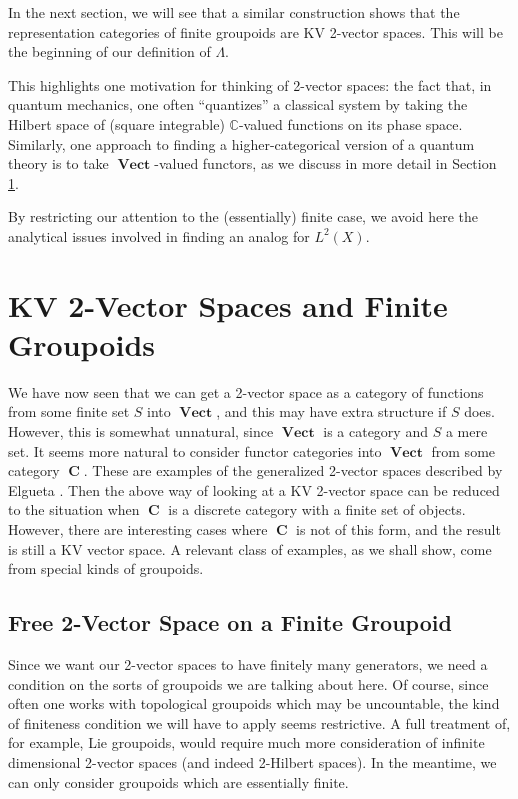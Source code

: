 \documentclass[10pt]{amsart}
\numberwithin{theorem}{subsection}
\newcommand{\opname}[1]{\operatorname{#1}}
\newcommand{\catname}[1]{\boldsymbol{\opname{{#1}}}}
\newcommand{\C}{\catname{C}}
\newcommand{\V}{\catname{Vect}}
\newcommand{\FV}{\Lambda}
\begin{document}
In the next section, we will see that a similar construction shows that the representation categories of finite groupoids are KV 2-vector spaces.  This will be the beginning of our definition of $\FV$.

This highlights one motivation for thinking of 2-vector spaces: the
fact that, in quantum mechanics, one often ``quantizes'' a classical
system by taking the Hilbert space of (square integrable)
$\mathbb{C}$-valued functions on its phase space.  Similarly, one
approach to finding a higher-categorical version of a quantum theory
is to take $\V$-valued functors, as we discuss in more detail in
Section \ref{sec:kv2vsgrpd}.

By restricting our attention to the (essentially) finite case, we
avoid here the analytical issues involved in finding an analog for
$L^2(X)$.

\section{KV 2-Vector Spaces and Finite Groupoids}\label{sec:kv2vsgrpd}

We have now seen that we can get a 2-vector space as a category of
functions from some finite set $S$ into $\V$, and this may have extra
structure if $S$ does.  However, this is somewhat unnatural, since
$\V$ is a category and $S$ a mere set.  It seems more natural to
consider functor categories into $\V$ from some category $\C$.  These
are examples of the generalized 2-vector spaces described by Elgueta
\cite{elgueta}.  Then the above way of looking at a KV 2-vector space
can be reduced to the situation when $\C$ is a discrete category with
a finite set of objects.  However, there are interesting cases where
$\C$ is not of this form, and the result is still a KV vector space.
A relevant class of examples, as we shall show, come from special
kinds of groupoids.

\subsection{Free 2-Vector Space on a Finite Groupoid}

Since we want our 2-vector spaces to have finitely many generators, we
need a condition on the sorts of groupoids we are talking about here.
Of course, since often one works with topological groupoids which may
be uncountable, the kind of finiteness condition we will have to apply
seems restrictive.  A full treatment of, for example, Lie
groupoids, would require much more consideration of infinite
dimensional 2-vector spaces (and indeed 2-Hilbert spaces).  In the
meantime, we can only consider groupoids which are essentially
finite.
\end{document}
